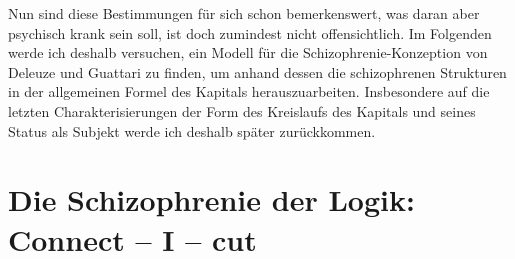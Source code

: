 \documentclass[12pt,
               paper=a4,
               twoside=false,
               onehalfspacing,
               bibliography=totoc,
               toc=graduated,
               ]{scrartcl}
\newcommand{\pc}[2]{\parencite[#1]{#2}}
\newcommand{\worries}[1]{\ifdraft{\textcolor{blue}{\texttt{(#1)}}}{}}
\newcommand{\gwg}{G--W--G'\xspace}
\newcommand{\cic}{Connect -- I -- cut\xspace}
\newcommand{\dg}{Deleuze und Guattari\xspace}
\begin{document}
Nun sind diese Bestimmungen für sich schon bemerkenswert, was daran
aber psychisch krank sein soll, ist doch zumindest nicht
offensichtlich. Im Folgenden werde ich deshalb versuchen, ein Modell
für die Schizophrenie-Konzeption von \dg zu finden, um anhand dessen
die schizophrenen Strukturen in der allgemeinen Formel des Kapitals
herauszuarbeiten. Insbesondere auf die letzten Charakterisierungen der
Form des Kreislaufs des Kapitals und seines Status als Subjekt werde
ich deshalb später zurückkommen.













\section{Die Schizophrenie der Logik: \cic}

%
\end{document}
